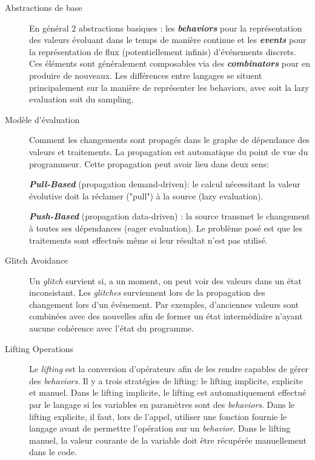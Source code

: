 \documentclass[10pt,final]{IEEEtran}
\begin{document}
\begin{description}
    \item[Abstractions de base]
    En général 2 abstractions basiques : les \textbf{\textit{behaviors}} pour la représentation des valeurs évoluant dans le temps de manière continue et les \textbf{\textit{events}} pour la représentation de flux (potentiellement infinis) d'événements discrets. Ces éléments sont généralement composables via des \textbf{\textit{combinators}} pour en produire de nouveaux. Les différences entre langages se situent principalement sur la manière de représenter les behaviors, avec soit la lazy evaluation soit du sampling.
    
    \item[Modèle d'évaluation]
    Comment les changements sont propagés dans le graphe de dépendance des valeurs et traitements. La propagation est automatique du point de vue du programmeur. Cette propagation peut avoir lieu dans deux sens: 
    
    \textbf{\textit{Pull-Based}} (propagation demand-driven):  le calcul nécessitant la valeur évolutive doit la réclamer ("pull") à la source (lazy evaluation).
    
    \textbf{\textit{Push-Based}} (propagation data-driven) : la source transmet le changement à toutes ses dépendances (eager evaluation). Le problème posé est que les traitements sont effectués même si leur résultat n'est pas utilisé.
    
    \item[Glitch Avoidance]
    Un \textit{glitch} survient si, a un moment, on peut voir des valeurs dans un état inconsistant. Les \textit{glitches} surviennent lors de la propagation des changement lors d'un évènement. Par exemples, d'anciennes valeurs sont combinées avec des nouvelles afin de former un état intermédiaire n'ayant aucune cohérence avec l'état du programme.
    
    \item[Lifting Operations]
    Le \textit{lifting} est la conversion d'opérateurs afin de les rendre capables de gérer des \textit{behaviors}. Il y a trois stratégies de lifting: le lifting implicite, explicite et manuel. Dans le lifting implicite, le lifting est automatiquement effectué par le langage si les variables en paramètres sont des \textit{behaviors}. Dans le lifting explicite, il faut, lors de l'appel, utiliser une fonction fournie le langage avant de permettre l'opération sur un \textit{behavior}. Dans le lifting manuel, la valeur courante de la variable doit être récupérée manuellement dans le code.
    

\end{description}
\end{document}
